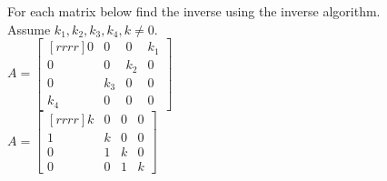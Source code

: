 \ii For each matrix below find the inverse using the inverse algorithm. 
\\
Assume $k_1,k_2,k_3,k_4,k \neq 0$. 
\vspace{.1in}\\
\bb
\ii $A=\begin{bmatrix}[rrrr]
0&0&0&k_1\\
0&0&k_2&0\\
0&k_3&0&0\\
k_4&0&0&0
\end{bmatrix}
$
\vspace{.1in}\\
\ii $A=\begin{bmatrix}[rrrr]
k&0&0&0\\
1&k&0&0\\
0&1&k&0\\
0&0&1&k
\end{bmatrix}$
\ee
